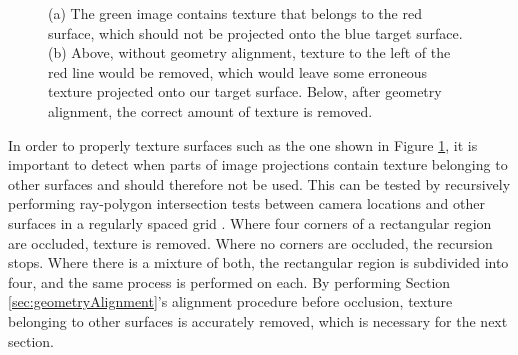 \documentclass[]{spie}  %
\begin{document}
\begin{figure}
  \centering
  \hspace{0.4cm} 
  \caption{(a) The green image contains texture that belongs to the red surface, which should not be projected onto the blue target surface. (b) Above, without geometry alignment, texture to the left of the red line would be removed, which would leave some erroneous texture projected onto our target surface. Below, after geometry alignment, the correct amount of texture is removed.}
  \label{fig:occlusion}
\end{figure}

In order to properly texture surfaces such as the one shown in Figure
\ref{fig:occlusion}, it is important to detect when parts of image
projections contain texture belonging to other surfaces and should
therefore not be used. This can be tested by recursively performing
ray-polygon intersection tests between camera locations and other
surfaces in a regularly spaced grid \cite{rayintersection}. Where four
corners of a rectangular region are occluded, texture is
removed. Where no corners are occluded, the recursion stops. Where
there is a mixture of both, the rectangular region is subdivided into
four, and the same process is performed on each. By performing Section
\ref{sec:geometryAlignment}'s alignment procedure before occlusion,
texture belonging to other surfaces is accurately removed, which is
necessary for the next section.
\end{document}
